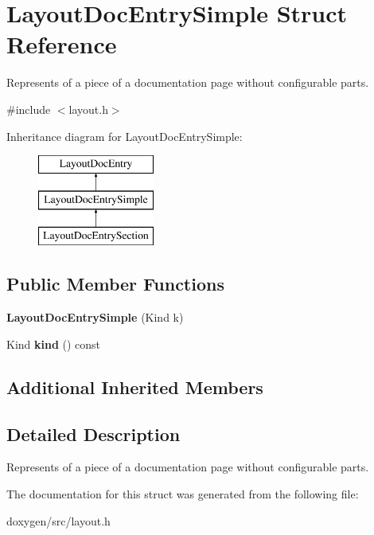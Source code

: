 \hypertarget{struct_layout_doc_entry_simple}{}\section{Layout\+Doc\+Entry\+Simple Struct Reference}
\label{struct_layout_doc_entry_simple}


Represents of a piece of a documentation page without configurable parts.  




{\ttfamily \#include $<$layout.\+h$>$}

Inheritance diagram for Layout\+Doc\+Entry\+Simple\+:\begin{figure}[H]
\begin{center}
\leavevmode
\includegraphics[height=3.000000cm]{struct_layout_doc_entry_simple}
\end{center}
\end{figure}
\subsection*{Public Member Functions}
\begin{DoxyCompactItemize}
\item 
\mbox{\label{struct_layout_doc_entry_simple_aca8a78abdd4bb324e1d3a2503ac79788}} 
{\bfseries Layout\+Doc\+Entry\+Simple} (Kind k)
\item 
\mbox{\label{struct_layout_doc_entry_simple_a4bb55bc63952e23401ec0c6b660cae58}} 
Kind {\bfseries kind} () const
\end{DoxyCompactItemize}
\subsection*{Additional Inherited Members}


\subsection{Detailed Description}
Represents of a piece of a documentation page without configurable parts. 

The documentation for this struct was generated from the following file\+:\begin{DoxyCompactItemize}
\item 
doxygen/src/layout.\+h\end{DoxyCompactItemize}

